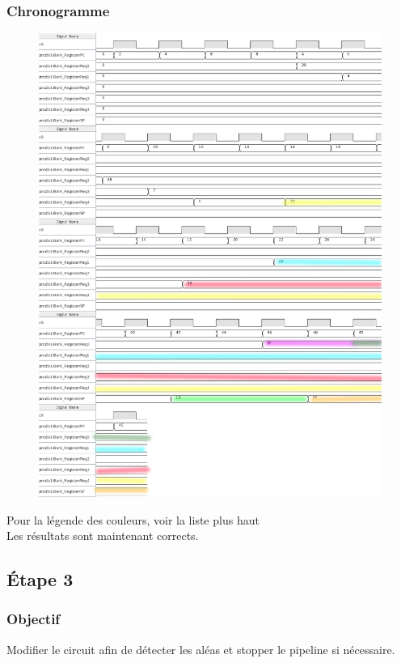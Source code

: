 \documentclass[a4paper]{article} %
\begin{document}
\subsubsection{Chronogramme}
\begin{figure}[H]
    \centering
    \includegraphics[width=.8\textwidth]{src/CHRONO_ET2_CORR_COL.png}
    \label{fig:chrono_et2_corr_pic}
\end{figure}
Pour la légende des couleurs, voir la liste plus haut \\
Les résultats sont maintenant corrects.
\subsection{Étape 3}
\subsubsection{Objectif}
Modifier le circuit afin de détecter les aléas et stopper le pipeline si nécessaire.
\end{document}
